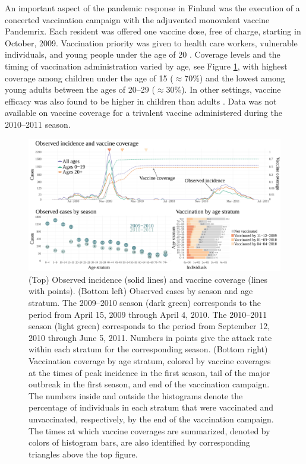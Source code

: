 An important aspect of the pandemic response in Finland was the execution of a concerted vaccination campaign with the adjuvented monovalent vaccine Pandemrix. Each resident was offered one vaccine dose, free of charge, starting in October, 2009. Vaccination priority was given to health care workers, vulnerable individuals, and young people under the age of 20 \cite{syrjanen2014effectiveness}. Coverage levels and the timing of vaccination administration varied by age, see Figure \ref{fig:finland_fludat_intro}, with highest coverage among children under the age of 15 ($ \approx $70\%) and the lowest among young adults between the ages of 20--29 ($ \approx $30\%). In other settings, vaccine efficacy was also found to be higher in children than adults \cite{lansbury2017effectiveness}. Data was not available on vaccine coverage for a trivalent vaccine administered during the 2010--2011 season. 

\begin{figure}
	\centering
	\includegraphics[width=\linewidth]{figures/fludat_plots}
	\caption[A(H1N1)pdm09 incidence and vaccination data from Finland, April 15, 2009 --- June 5, 2011.]{(Top) Observed incidence (solid lines) and vaccine coverage (lines with points). (Bottom left) Observed cases by season and age stratum. The 2009--2010 season (dark green) corresponds to the period from April 15, 2009 through April 4, 2010. The 2010--2011 season (light green) corresponds to the period from September 12, 2010 through June 5, 2011. Numbers in points give the attack rate within each stratum for the corresponding season. (Bottom right) Vaccination coverage by age stratum, colored by vaccine coverages at the times of peak incidence in the first season, tail of the major outbreak in the first season, and end of the vaccination campaign. The numbers inside and outside the histograms denote the percentage of individuals in each stratum that were vaccinated and unvaccinated, respectively, by the end of the vaccination campaign. The times at which vaccine coverages are summarized, denoted by colors of histogram bars, are also identified by corresponding triangles above the top figure.}
	\label{fig:finland_fludat_intro}
\end{figure}

